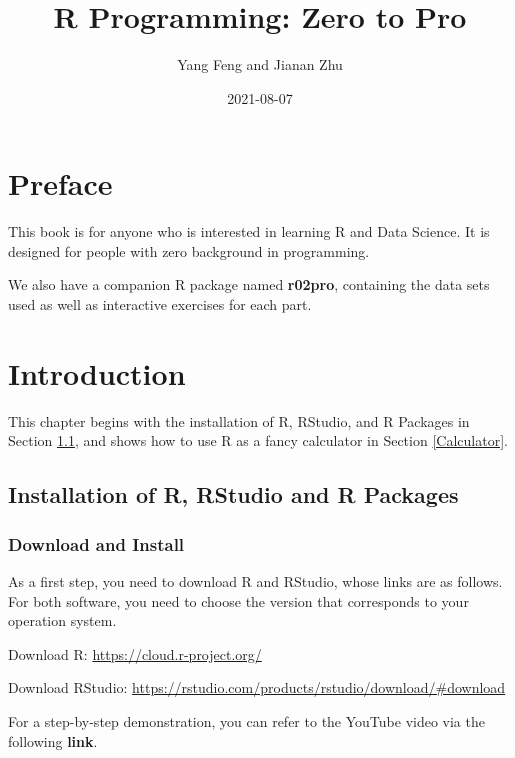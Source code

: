 \documentclass[
]{book}
\title{R Programming: Zero to Pro}
\author{Yang Feng and Jianan Zhu}
\date{2021-08-07}
\newenvironment{infobox}[1]
  {
  \begin{itemize}
  \renewcommand{\labelitemi}{
    \raisebox{-.7\height}[0pt][0pt]{
      {\setkeys{Gin}{width=3em,keepaspectratio}
        \texttt{[image: pics/\#1]}}
    }
  }
  \setlength{\fboxsep}{1em}
  \begin{blackbox}
  \item
  }
  {
  \end{blackbox}
  \end{itemize}
  }
\newenvironment{blackbox}{
  \definecolor{shadecolor}{rgb}{0, 0, 0}  %
  \color{white}
  \begin{shaded}}
 {\end{shaded}}
\begin{document}
\maketitle

{
\setcounter{tocdepth}{1}
\tableofcontents
}
\hypertarget{preface}{%
\chapter*{Preface}\label{preface}}

This book is for anyone who is interested in learning R and Data Science. It is designed for people with zero background in programming.

We also have a companion R package named \textbf{r02pro}, containing the data sets used as well as interactive exercises for each part.

\hypertarget{introduction}{%
\chapter{Introduction}\label{introduction}}

This chapter begins with the installation of R, RStudio, and R Packages in Section \ref{Installation}, and shows how to use R as a fancy calculator in Section \ref{Calculator}.

\hypertarget{Installation}{%
\section{Installation of R, RStudio and R Packages}\label{Installation}}

\hypertarget{download-and-install}{%
\subsection{Download and Install}\label{download-and-install}}

As a first step, you need to download R and RStudio, whose links are as follows. For both software, you need to choose the version that corresponds to your operation system.

Download R: \url{https://cloud.r-project.org/}

Download RStudio: \url{https://rstudio.com/products/rstudio/download/\#download}

\begin{infobox}{caution}
For a step-by-step demonstration, you can refer to the YouTube video via the following \textbf{link}.

\end{infobox}
\end{document}
